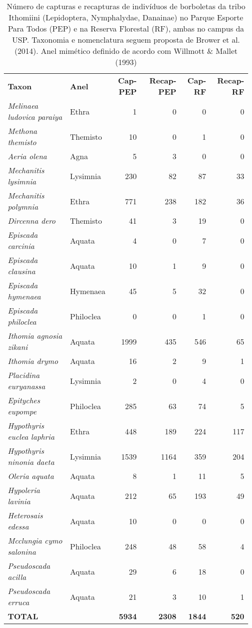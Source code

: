 \begin{table}
\caption{\label{tab:borb1} Número de capturas e recapturas de indivíduos 
de borboletas da tribo
Ithomiini (Lepidoptera, Nymphalydae, Danainae) no Parque
Esporte Para Todos (PEP) e na Reserva Florestal (RF), ambas no campus da
USP. Taxonomia e nomenclatura seguem proposta de Brower et
al. (2014). Anel mimético definido de acordo com Willmott \& Mallet
(1993)}
\begin{tabular}{llrrrr}
  \textbf{Taxon} & \textbf{Anel} & \textbf{Cap-PEP} & \textbf{Recap-PEP} & \textbf{Cap-RF} & \textbf{Recap-RF}\\
 \emph{ Melinaea ludovica paraiya} & Ethra & 1 & 0 & 0 & 0\\
  \emph{Methona themisto} & Themisto & 10 & 0 & 1 & 0\\
  \emph{Aeria olena} & Agna & 5 & 3 & 0 & 0\\
  \emph{Mechanitis lysimnia} & Lysimnia & 230 & 82 & 87 & 33\\
  \emph{Mechanitis polymnia} & Ethra & 771 & 238 & 182 & 36\\
  \emph{Dircenna dero} & Themisto & 41 & 3 & 19 & 0\\
  \emph{Episcada carcinia} & Aquata & 4 & 0 & 7 & 0\\
  \emph{Episcada clausina} & Aquata & 10 & 1 & 9 & 0\\
  \emph{Episcada hymenaea} & Hymenaea & 45 & 5 & 32 & 0\\
  \emph{Episcada philoclea} & Philoclea & 0 & 0 & 1 & 0\\
  \emph{Ithomia agnosia zikani} & Aquata & 1999 & 435 & 546 & 65\\
  \emph{Ithomia drymo} & Aquata & 16 & 2 & 9 & 1\\
  \emph{Placidina euryanassa} & Lysimnia & 2 & 0 & 4 & 0\\
  \emph{Epityches eupompe} & Philoclea & 285 & 63 & 74 & 5\\
  \emph{Hypothyris euclea laphria} & Ethra & 448 & 189 & 224 & 117\\
  \emph{Hypothyris ninonia daeta} & Lysimnia & 1539 & 1164 & 359 & 204\\
  \emph{Oleria aquata} & Aquata & 8 & 1 & 11 & 5\\
  \emph{Hypoleria lavinia} & Aquata & 212 & 65 & 193 & 49\\
  \emph{Heterosais edessa} & Aquata & 10 & 0 & 0 & 0\\
  \emph{Mcclungia cymo salonina} & Philoclea & 248 & 48 & 58 & 4\\
  \emph{Pseudoscada acilla} & Aquata & 29 & 6 & 18 & 0\\
  \emph{Pseudoscada erruca} & Aquata & 21 & 3 & 10 & 1\\
  \textbf{TOTAL} & & \textbf{5934} & \textbf{2308} & \textbf{1844} & \textbf{520}\\
\end{tabular} 
\end{table}